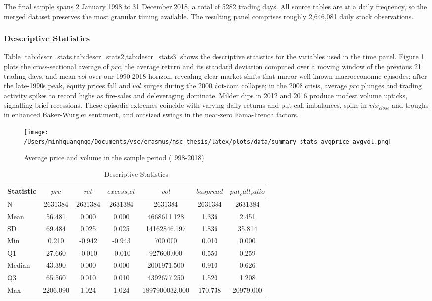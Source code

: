 The final sample spans 2 January 1998 to 31 December 2018, a total of 5282 trading days. All source tables are at a daily frequency, so the merged dataset preserves the most granular timing available. The resulting panel comprises roughly 2,646,081 daily stock observations. 

\subsubsection{Descriptive Statistics}
Table \cref{tab:descr_stats,tab:descr_stats2,tab:descr_stats3} shows the descriptive statistics for the variables used in the time panel. Figure \ref{fig:avgprice_avgvol} plots the cross-sectional average of $prc$, the average return and its standard deviation computed over a moving window of the previous 21 trading days, and mean $vol$ over our 1990-2018 horizon, revealing clear market shifts that mirror well-known macroeconomic episodes: after the late-1990s peak, equity prices fall and $vol$ surges during the 2000 dot-com collapse; in the 2008 crisis, average $prc$ plunges and trading activity spikes to record highs as fire-sales and deleveraging dominate. Milder dips in 2012 and 2016 produce modest volume upticks, signalling brief recessions. These episodic extremes coincide with varying daily returns and put-call imbalances, spike in $vix_{close}$ and troughs in enhanced Baker-Wurgler sentiment, and outsized swings in the near-zero Fama-French factors. 


\begin{figure}[H]
    \centering
    \texttt{[image: /Users/minhquangngo/Documents/vsc/erasmus/msc\_thesis/latex/plots/data/summary\_stats\_avgprice\_avgvol.png]}
    \caption{Average price and volume in the sample period (1998-2018).}
    \label{fig:avgprice_avgvol}
\end{figure}

\begin{table}[ht]
\centering
\caption{Descriptive Statistics}
\label{tab:descr_stats}
\begin{tabular}{lcccccc}
\toprule
Statistic & $prc$ & $ret$ & $excess_ret$ & $vol$ & $baspread$ & $put_call_ratio$ \\\midrule
N & 2631384 & 2631384 & 2631384 & 2631384 & 2631384 & 2631384 \\
Mean & 56.481 & 0.000 & 0.000 & 4668611.128 & 1.336 & 2.451 \\
SD & 69.484 & 0.025 & 0.025 & 14162846.197 & 1.836 & 35.814 \\
Min & 0.210 & -0.942 & -0.943 & 700.000 & 0.010 & 0.000 \\
Q1 & 27.660 & -0.010 & -0.010 & 927600.000 & 0.550 & 0.259 \\
Median & 43.390 & 0.000 & 0.000 & 2001971.500 & 0.910 & 0.626 \\
Q3 & 65.560 & 0.010 & 0.010 & 4392677.250 & 1.520 & 1.208 \\
Max & 2206.090 & 1.024 & 1.024 & 1897900032.000 & 170.738 & 20979.000 \\
\bottomrule
\end{tabular}
\end{table}

